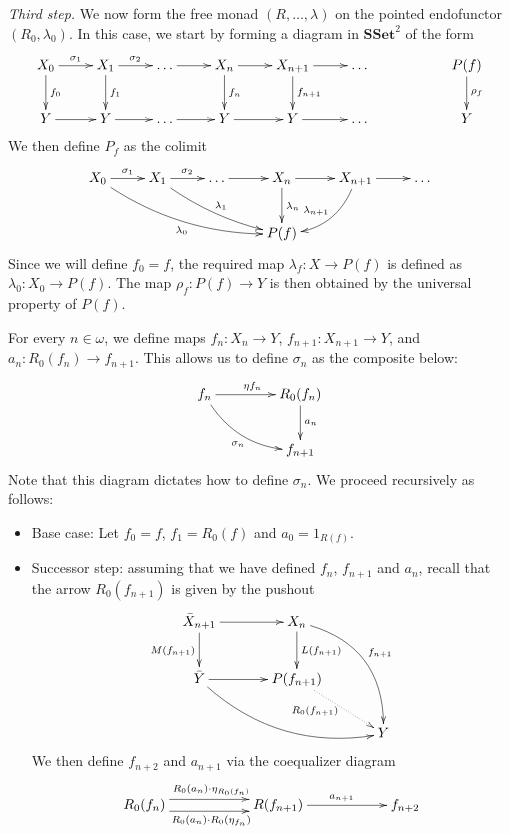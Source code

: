 \documentclass[reqno,10pt,a4paper,oneside]{amsart}
\theoremstyle{definition}
\newcommand{\co}{\colon}
\newcommand{\SSet}{\mathbf{SSet}}
\begin{document}
 
 \medskip

\noindent 
 {\itshape Third step.} We now form the free monad $(R,  \ldots, \lambda)$ on the pointed endofunctor $(R_0, \lambda_0)$. In this case, we start by forming a diagram in $\SSet^2$ of the form
 \[
 \xymatrix{
 X_0 \ar[r]^{\sigma_1}  \ar[d]^{f_0} & X_1 \ar[r]^{\sigma_2} \ar[d]^{f_1} & \ldots \ar[r] & X_n \ar[r] \ar[d]^{f_n} 
 & X_{n+1} \ar[r] \ar[d]^{f_{n+1}} & \ldots & & P(f) \ar[d]^{\rho_f} \\
 Y \ar[r] & Y \ar[r] & \ldots \ar[r] & Y \ar[r] & Y \ar[r] & \ldots & & Y }
\] 
We then define $P_f$ as the colimit 
 \[
 \xymatrix{
 X_0 \ar[r]^{\sigma_1} \ar@/_1pc/[drrr]_{\lambda_0} & X_1 \ar@/_0.5pc/[drr]^{\lambda_1} \ar[r]^{\sigma_2}  & \ldots \ar[r] & X_n \ar[r]  \ar[d]^{\lambda_n} & X_{n+1} \ar[r] \ar@/^1pc/[dl]_{\lambda_{n+1}} & \ldots  \\
  & & & P(f) & & }
  \]
Since we will define $f_0 = f$, the required map $\lambda_f \co X \to P(f)$ is defined as $\lambda_0 
\co X_0 \to P(f)$. The map $\rho_f \co P(f) \to Y$ is then obtained by the universal property of $P(f)$.


\medskip
 
  For every $n \in \omega$, we define maps $f_n \co X_n \to Y$, $f_{n+1} \co X_{n+1} \to Y$, and $a_{n} \co R_0(f_n) \to f_{n+1}$. This
  allows us to define $\sigma_{n}$ as the composite below:
  \[
  \xymatrix@C=1.5cm{
  f_n \ar[r]^{\eta f_n}  \ar@/_1pc/[dr]_{\sigma_n} & R_0(f_n) \ar[d]^{a_{n}} \\ 
   & f_{n+1} }
   \]
   Note that this diagram dictates how to define $\sigma_n$. We proceed recursively as follows:
 
 \begin{itemize}
 \item Base case: Let $f_0 = f$, $f_1 = R_0(f)$ and $a_0 = 1_{R(f)}$.
 \item Successor step: assuming that we have defined $f_n$, $f_{n+1}$ and $a_{n}$,  recall that the arrow $R_0(f_{n+1})$ is given by the pushout
 \[
   \xymatrix@C=1.2cm{
 \bar{X}_{n+1} \ar[r]  \ar[d]_{M(f_{n+1})} & X_n \ar[d]^{L(f_{n+1})} \ar@/^1.8pc/[ddr]^{f_{n+1}} \\
\bar{Y} \ar[r] \ar@/_1.5pc/[drr]  & P(f_{n+1}) \ar@{.>}[dr]_-(.3){R_0(f_{n+1})} \\ 
   & & Y  }
 \]
We then define $f_{n+2}$ and $a_{n+1}$ via  the coequalizer diagram
 \[
 \xymatrix@=2cm{
 R_0(f_n) \ar@<1ex>[r]^{R_0 (a_n) \cdot \eta_{R_0(f_n)}}  \ar@<-1ex>[r]_{ R_0(a_n) \cdot R_0(\eta_{f_n})}& R(f_{n+1}) 
 \ar[r]^{a_{n+1}} & f_{n+2} }
 \]
 \end{itemize}
 
\end{document}
